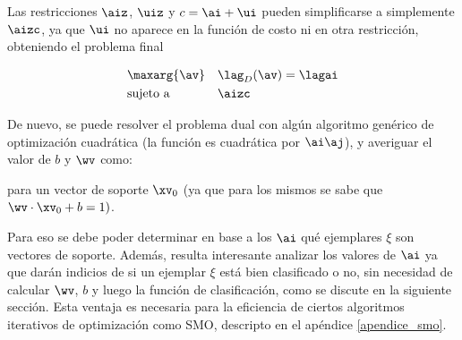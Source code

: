 Las restricciones $\aiz$, $\uiz$ y $ c = \ai+\ui $ pueden simplificarse a simplemente $ \aizc$, ya que $\ui$ no aparece en la función de costo ni en otra restricción, obteniendo el problema final 

\begin{equation}
\begin{aligned}
&  \maxarg{\av}
& & \lag_D(\av)= \lagai \\
& \text{sujeto a}
& & \aizc
\end{aligned}
\end{equation}


De nuevo, se puede resolver el problema dual con algún algoritmo genérico de optimización cuadrática (la función es cuadrática por $\ai \aj$), y averiguar el valor de $b$ y $\wv$ como:


para un vector de soporte $\xv_0$ (ya que para los mismos se sabe que $\wv \cdot \xv_0 +b =1)$. 

Para eso se debe poder determinar en base a los $\ai$ qué ejemplares $\xi$ son vectores de soporte. Además, resulta interesante analizar los valores de $\ai$ ya que darán indicios de si un ejemplar $\xi$ está bien clasificado o no, sin necesidad de calcular $\wv$, $b$ y luego la función de clasificación, como se discute en la siguiente sección. Esta ventaja es necesaria para la eficiencia de ciertos algoritmos iterativos de optimización como SMO, descripto en el apéndice \ref{apendice_smo}. 


